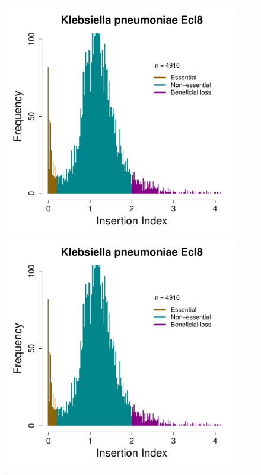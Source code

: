 \documentclass[a4paper,10pt, twocolumn]{article}
\begin{document}
\begin{figure}
\begin{tabular}{c c c}
\includegraphics[page=3, scale=0.28]{per-species-insertion-index.pdf} \\ 
\includegraphics[page=4, scale=0.28]{per-species-insertion-index.pdf} &

\end{tabular}
\end{figure}
\end{document}
